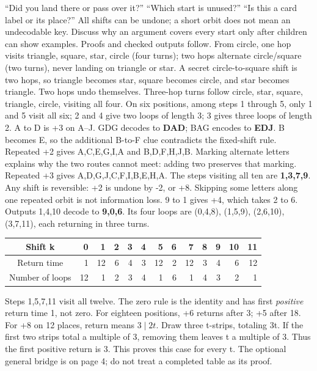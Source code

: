 \documentclass[12pt]{extarticle}
\begin{document}
``Did you land there or pass over it?'' ``Which start is unused?'' ``Is this a card label or its place?'' All shifts can be undone; a short orbit does not mean an undecodable key. Discuss why an argument covers every start only after children can show examples. Proofs and checked outputs follow.
\newpage
{}
From circle, one hop visits triangle, square, star, circle (four turns); two hops alternate circle/square (two turns), never landing on triangle or star. A secret circle-to-square shift is two hops, so triangle becomes star, square becomes circle, and star becomes triangle. Two hops undo themselves. Three-hop turns follow circle, star, square, triangle, circle, visiting all four. On six positions, among steps 1 through 5, only 1 and 5 visit all six; 2 and 4 give two loops of length 3; 3 gives three loops of length 2.
A to D is +3 on A--J. GDG decodes to \textbf{DAD}; BAG encodes to \textbf{EDJ}. B becomes E, so the additional B-to-F clue contradicts the fixed-shift rule. Repeated +2 gives A,C,E,G,I,A and B,D,F,H,J,B. Marking alternate letters explains why the two routes cannot meet: adding two preserves that marking. Repeated +3 gives A,D,G,J,C,F,I,B,E,H,A. The steps visiting all ten are \textbf{1,3,7,9}. Any shift is reversible: +2 is undone by -2, or +8. Skipping some letters along one repeated orbit is not information loss.
9 to 1 gives +4, which takes 2 to 6. Outputs 1,4,10 decode to \textbf{9,0,6}. Its four loops are (0,4,8), (1,5,9), (2,6,10), (3,7,11), each returning in three turns.
\begin{center}\renewcommand{\arraystretch}{1.25}\begin{tabular}{c|rrrrrrrrrrrr}Shift k&0&1&2&3&4&5&6&7&8&9&10&11\\\hline Return time&1&12&6&4&3&12&2&12&3&4&6&12\\Number of loops&12&1&2&3&4&1&6&1&4&3&2&1\end{tabular}\end{center}
Steps 1,5,7,11 visit all twelve. The zero rule is the identity and has first \emph{positive} return time 1, not zero. For eighteen positions, +6 returns after 3; +5 after 18.
For +8 on 12 places, return means \(3\mid2t\). Draw three t-strips, totaling 3t. If the first two strips total a multiple of 3, removing them leaves t a multiple of 3. Thus the first positive return is 3. This proves this case for every t. The optional general bridge is on page 4; do not treat a completed table as its proof.
\end{document}
